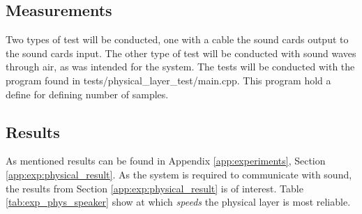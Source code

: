 	\subsection{Measurements}
	Two types of test will be conducted, one with a cable the sound cards output to the sound cards input. The other type of test will be conducted with sound waves through air, as was intended for the system.
	The tests will be conducted with the program found in tests/physical\_layer\_test/main.cpp. This program hold a define for defining number of samples.
	
	\subsection{Results}
	As mentioned results can be found in Appendix \ref{app:experiments}, Section \ref{app:exp:physical_result}. As the system is required to communicate with sound, the results from Section \ref{app:exp:physical_result} is of interest. Table \ref{tab:exp_phys_speaker} show at which \textit{speeds} the physical layer is most reliable.